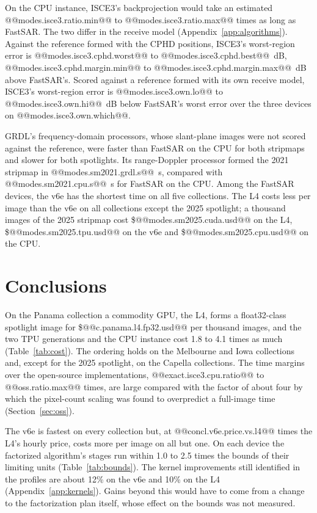 \documentclass[11pt]{article}
\begin{document}
On the CPU instance, ISCE3's backprojection would take an estimated @@modes.isce3.ratio.min@@ to @@modes.isce3.ratio.max@@ times as long as FastSAR. The two differ in the receive model (Appendix~\ref{app:algorithms}). Against the reference formed with the CPHD positions, ISCE3's worst-region error is @@modes.isce3.cphd.worst@@ to @@modes.isce3.cphd.best@@~dB, @@modes.isce3.cphd.margin.min@@ to @@modes.isce3.cphd.margin.max@@~dB above FastSAR's. Scored against a reference formed with its own receive model, ISCE3's worst-region error is @@modes.isce3.own.lo@@ to @@modes.isce3.own.hi@@~dB below FastSAR's worst error over the three devices on @@modes.isce3.own.which@@.

GRDL's frequency-domain processors, whose slant-plane images were not scored against the reference, were faster than FastSAR on the CPU for both stripmaps and slower for both spotlights. Its range-Doppler processor formed the 2021 stripmap in @@modes.sm2021.grdl.s@@~s, compared with @@modes.sm2021.cpu.s@@~s for FastSAR on the CPU. Among the FastSAR devices, the v6e has the shortest time on all five collections. The L4 costs less per image than the v6e on all collections except the 2025 spotlight; a thousand images of the 2025 stripmap cost \$@@modes.sm2025.cuda.usd@@ on the L4, \$@@modes.sm2025.tpu.usd@@ on the v6e and \$@@modes.sm2025.cpu.usd@@ on the CPU.





\section{Conclusions}
\label{sec:concl}

On the Panama collection a commodity GPU, the L4, forms a float32-class spotlight image for \$@@c.panama.l4.fp32.usd@@ per thousand images, and the two TPU generations and the CPU instance cost 1.8 to 4.1 times as much (Table~\ref{tab:cost}). The ordering holds on the Melbourne and Iowa collections and, except for the 2025 spotlight, on the Capella collections. The time margins over the open-source implementations, @@exact.isce3.cpu.ratio@@ to @@oss.ratio.max@@ times, are large compared with the factor of about four by which the pixel-count scaling was found to overpredict a full-image time (Section~\ref{sec:oss}).

The v6e is fastest on every collection but, at @@concl.v6e.price.vs.l4@@ times the L4's hourly price, costs more per image on all but one. On each device the factorized algorithm's stages run within 1.0 to 2.5 times the bounds of their limiting units (Table~\ref{tab:bounds}). The kernel improvements still identified in the profiles are about 12\% on the v6e and 10\% on the L4 (Appendix~\ref{app:kernels}). Gains beyond this would have to come from a change to the factorization plan itself, whose effect on the bounds was not measured.
\end{document}

